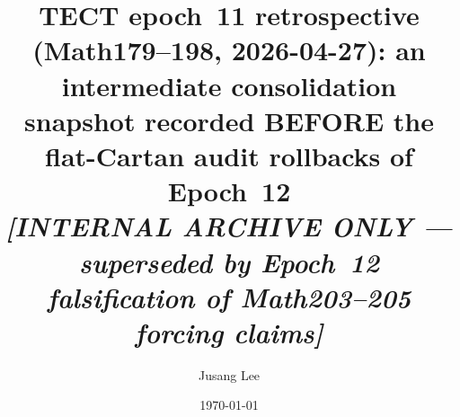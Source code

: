 



\title{TECT epoch~11 retrospective (Math179--198, 2026-04-27): an
intermediate consolidation snapshot recorded BEFORE the
flat-Cartan audit rollbacks of Epoch~12 \\
\normalsize{\textit{[INTERNAL ARCHIVE ONLY — superseded by
Epoch~12 falsification of Math203--205 forcing claims]}}}

\author{Jusang Lee}

\date{\today}

